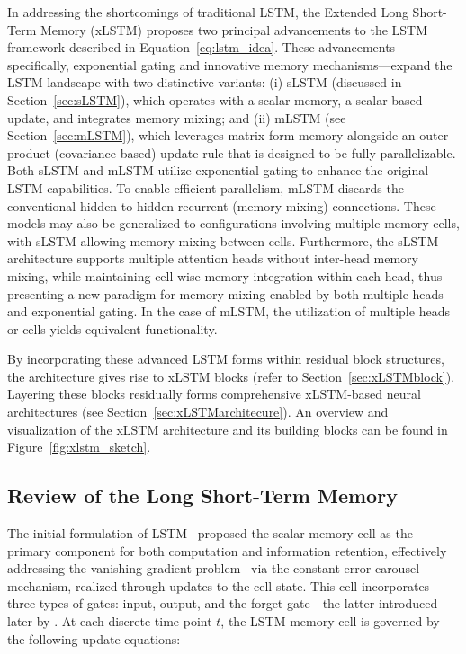 In addressing the shortcomings of traditional LSTM, the Extended Long Short-Term Memory (xLSTM) proposes two principal advancements to the LSTM framework described in Equation~\eqref{eq:lstm_idea}. These advancements—specifically, exponential gating and innovative memory mechanisms—expand the LSTM landscape with two distinctive variants: (i) sLSTM (discussed in Section~\ref{sec:sLSTM}), which operates with a scalar memory, a scalar-based update, and integrates memory mixing; and (ii) mLSTM (see Section~\ref{sec:mLSTM}), which leverages matrix-form memory alongside an outer product (covariance-based) update rule that is designed to be fully parallelizable. Both sLSTM and mLSTM utilize exponential gating to enhance the original LSTM capabilities. To enable efficient parallelism, mLSTM discards the conventional hidden-to-hidden recurrent (memory mixing) connections. These models may also be generalized to configurations involving multiple memory cells, with sLSTM allowing memory mixing between cells. Furthermore, the sLSTM architecture supports multiple attention heads without inter-head memory mixing, while maintaining cell-wise memory integration within each head, thus presenting a new paradigm for memory mixing enabled by both multiple heads and exponential gating. In the case of mLSTM, the utilization of multiple heads or cells yields equivalent functionality.

By incorporating these advanced LSTM forms within residual block structures, the architecture gives rise to xLSTM blocks (refer to Section~\ref{sec:xLSTMblock}). Layering these blocks residually forms comprehensive xLSTM-based neural architectures (see Section~\ref{sec:xLSTMarchitecure}). An overview and visualization of the xLSTM architecture and its building blocks can be found in Figure~\ref{fig:xlstm_sketch}.

\subsection{Review of the Long Short-Term Memory}
\label{sec:orgLSTM}

The initial formulation of LSTM~\citep{Hochreiter:91,Hochreiter:97nips,Hochreiter:97} proposed the scalar memory cell as the primary component for both computation and information retention, effectively addressing the vanishing gradient problem~\citep{Hochreiter:91,Hochreiter:00book} via the constant error carousel mechanism, realized through updates to the cell state. This cell incorporates three types of gates: input, output, and the forget gate—the latter introduced later by \citet{Gers:00}. At each discrete time point $t$, the LSTM memory cell is governed by the following update equations:

